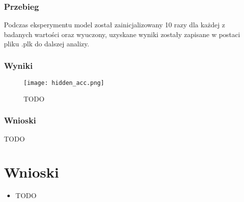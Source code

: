 \documentclass{article}
\begin{document}
\subsubsection*{Przebieg}

Podczas eksperymentu model został zainicjalizowany 10 razy dla każdej z badanych wartości oraz wyuczony, uzyskane wyniki zostały zapisane w postaci pliku .plk do dalszej analizy.

\subsubsection*{Wyniki}
\begin{figure}[H]
	\centering
	\caption{TODO}
	\texttt{[image: hidden\_acc.png]}
	\label{fig:res41}
\end{figure}

\subsubsection*{Wnioski}

TODO


\newpage
\section{Wnioski}

\begin{itemize}
	\item TODO
\end{itemize}
\end{document}
